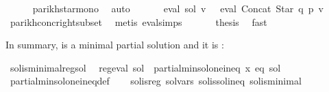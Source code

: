 \begin{isabellebody}
\ \ \ \ \isamarkupfalse%
\ parikh{\isacharunderscore}{\kern0pt}star{\isacharunderscore}{\kern0pt}mono\ \isamarkupfalse%
\ auto\isanewline
\ \ \isamarkupfalse%
\ \isamarkupfalse%
\ {\isachardoublequoteopen}{\isasymPsi}\ {\isacharparenleft}{\kern0pt}eval\ sol\ v{\isacharparenright}{\kern0pt}\ {\isasymsubseteq}\ {\isasymPsi}\ {\isacharparenleft}{\kern0pt}eval\ {\isacharparenleft}{\kern0pt}Concat\ {\isacharparenleft}{\kern0pt}Star\ q{\isacharparenright}{\kern0pt}\ p{\isacharparenright}{\kern0pt}\ v{\isacharparenright}{\kern0pt}{\isachardoublequoteclose}\isanewline
\ \ \ \ \isamarkupfalse%
\ parikh{\isacharunderscore}{\kern0pt}conc{\isacharunderscore}{\kern0pt}right{\isacharunderscore}{\kern0pt}subset\ \isamarkupfalse%
\ {\isacharparenleft}{\kern0pt}metis\ eval{\isachardot}{\kern0pt}simps{\isacharparenleft}{\kern0pt}{}{\isacharparenright}{\kern0pt}{\isacharparenright}{\kern0pt}\isanewline
\ \ \isamarkupfalse%
\ {}\ \isamarkupfalse%
\ {\isacharquery}{\kern0pt}thesis\ \isamarkupfalse%
\ fast\isanewline
{}\isamarkupfalse%
%
\endisatagproof
{\isafoldproof}%
%
\isadelimproof
%
\endisadelimproof
%
\begin{isamarkuptext}%
In summary,  is a minimal partial solution and it is :%
\end{isamarkuptext}\isamarkuptrue%
\isamarkupfalse%
\ sol{\isacharunderscore}{\kern0pt}is{\isacharunderscore}{\kern0pt}minimal{\isacharunderscore}{\kern0pt}reg{\isacharunderscore}{\kern0pt}sol{\isacharcolon}{\kern0pt}\isanewline
\ \ {\isachardoublequoteopen}reg{\isacharunderscore}{\kern0pt}eval\ sol\ {\isasymand}\ partial{\isacharunderscore}{\kern0pt}min{\isacharunderscore}{\kern0pt}sol{\isacharunderscore}{\kern0pt}one{\isacharunderscore}{\kern0pt}ineq\ x\ eq\ sol{\isachardoublequoteclose}\isanewline
%
\isadelimproof
\ \ %
\endisadelimproof
%
\isatagproof
{}\isamarkupfalse%
\ partial{\isacharunderscore}{\kern0pt}min{\isacharunderscore}{\kern0pt}sol{\isacharunderscore}{\kern0pt}one{\isacharunderscore}{\kern0pt}ineq{\isacharunderscore}{\kern0pt}def\isanewline
\ \ \isamarkupfalse%
\ sol{\isacharunderscore}{\kern0pt}is{\isacharunderscore}{\kern0pt}reg\ sol{\isacharunderscore}{\kern0pt}vars\ sol{\isacharunderscore}{\kern0pt}is{\isacharunderscore}{\kern0pt}sol{\isacharunderscore}{\kern0pt}ineq\ sol{\isacharunderscore}{\kern0pt}is{\isacharunderscore}{\kern0pt}minimal\isanewline

\end{isabellebody}
